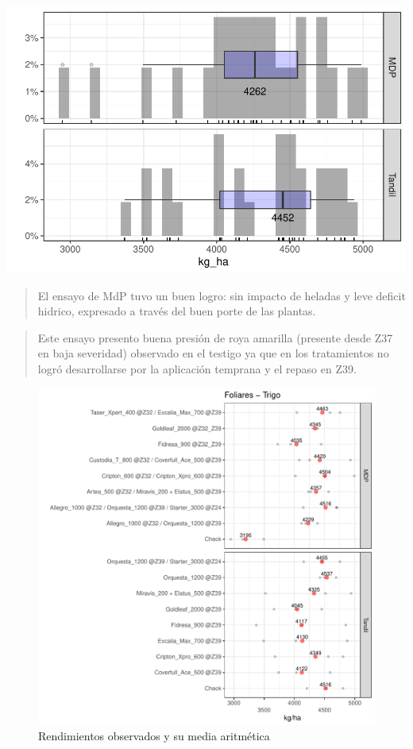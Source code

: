 \documentclass[
  letterpaper,
  DIV=11,
  numbers=noendperiod]{scrreprt}
\begin{document}
\includegraphics{./foliares_files/figure-pdf/unnamed-chunk-44-1.pdf}

\begin{quote}
El ensayo de MdP tuvo un buen logro: sin impacto de heladas y leve
deficit hidrico, expresado a través del buen porte de las plantas.
\end{quote}

\begin{quote}
Este ensayo presento buena presión de roya amarilla (presente desde Z37
en baja severidad) observado en el testigo ya que en los tratamientos no
logró desarrollarse por la aplicación temprana y el repaso en Z39.
\end{quote}

\begin{figure}

{\centering \includegraphics{./foliares_files/figure-pdf/unnamed-chunk-46-1.pdf}

}

\caption{Rendimientos observados y su media aritmética}

\end{figure}
\end{document}
